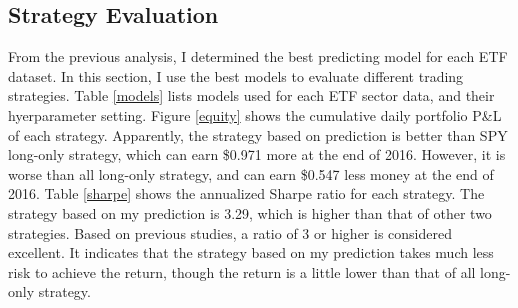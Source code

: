 \documentclass[letterpaper]{article}
\begin{document}

\subsection{Strategy Evaluation}
From the previous analysis, I determined the best predicting model for each ETF
dataset. In this section, I use the best models to evaluate different trading
strategies. Table \ref{models} lists models used for each ETF sector data, and
their hyerparameter setting. Figure \ref{equity} shows the cumulative daily
portfolio P\&L of each strategy. Apparently, the strategy based on prediction is
better than SPY long-only strategy, which can earn \$0.971 more at the end of
2016. However, it is worse than all long-only strategy, and can earn \$0.547
less money at the end of 2016. Table \ref{sharpe} shows the annualized Sharpe
ratio for each strategy. The strategy based on my prediction is 3.29, which is
higher than that of other two strategies. Based on previous studies, a ratio of
3 or higher is considered excellent. It indicates that the strategy based on my
prediction takes much less risk to achieve the return, though the return is
a little lower than that of all long-only strategy.
\end{document}
